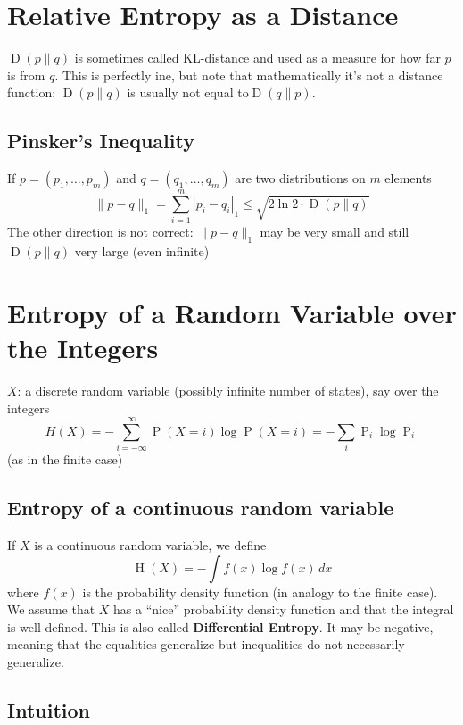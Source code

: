 \documentclass{article}
\begin{document}
\section{Relative Entropy as a Distance}

$\operatorname{D}\left(p\| q\right)$ is sometimes called KL-distance and used as a measure for how far $p$ is from $q$. This is perfectly ine, but note that mathematically it's not a distance function: $\operatorname{D}\left(p\| q\right)$ is usually not equal to$\operatorname{D}\left(q\| p \right)$.

\subsection{Pinsker's Inequality}

If $p=\left(p_1,\ldots,p_m\right)$ and $q=\left(q_1,\ldots,q_m\right)$ are two distributions on $m$ elements 
\[
\| p-q\|_1 = \sum_{i=1 }^{m }|p_i-q_i|_1 \leq \sqrt{2\ln 2 \cdot \operatorname{D}\left(p\| q\right)}
\]
The other direction is not correct: $\| p-q\|_1$ may be very small and still $\operatorname{D}\left(p\| q\right)$ very large (even infinite)

\section{Entropy of a Random Variable over the Integers}

$X$: a discrete random variable (possibly infinite number of states), say over the integers 
\[
H(X) = - \sum_{i=-\infty }^{\infty} \operatorname{P}\left(X=i \right)\log \operatorname{P }\left(X=i\right) = -\sum_i \operatorname{P}_i \log \operatorname{P }_i
\]
(as in the finite case)

\subsection{Entropy of a continuous random variable}

If $X$ is a continuous random variable, we define 
\[
\operatorname{H}(X) = - \int f(x) \log f(x) \, dx
\]
where $f(x)$ is the probability density function (in analogy to the finite case). We assume that $X$ has a ``nice'' probability density function and that the integral is well defined. This is also called \textbf{Differential Entropy}. It may be negative, meaning that the equalities generalize but inequalities do not necessarily generalize.

\subsection{Intuition}
\end{document}
